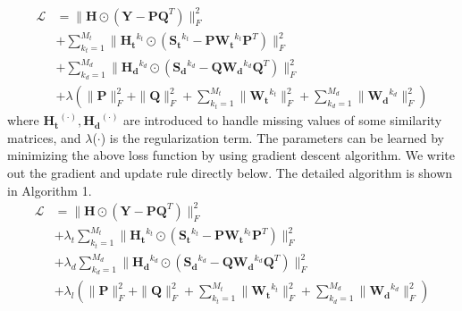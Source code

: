 \documentclass{article}
\begin{document}
\begin{equation} %
\begin{split}
\mathcal{L} &= \|\bm{H}\odot(\bm{Y}-\bm{P}\bm{Q}^T)\|_F^2 \\
&+ \sum_{k_t=1}^{M_t}\|\bm{H_t}^{k_t}\odot(\bm{S_t}^{k_t}-\bm{P}\bm{W_t}^{k_t}\bm{P}^T)\|_F^2 \\
&+ \sum_{k_d=1}^{M_d}\|\bm{H_d}^{k_d}\odot(\bm{S_d}^{k_d}-\bm{Q}\bm{W_d}^{k_d}\bm{Q}^T)\|_F^2 \\
&+ \lambda(\|\bm{P}\|_F^2+\|\bm{Q}\|_F^2+\sum_{k_t=1}^{M_t}\|\bm{W_t}^{k_t}\|_F^2+\sum_{k_d=1}^{M_d}\|\bm{W_d}^{k_d}\|_F^2)
\end{split}
\end{equation}
where $\bm{H_t}^{(\cdot)}, \bm{H_d}^{(\cdot)}$ are introduced to handle missing values of some similarity matrices, and $\lambda$($\cdot$) is the regularization term. The parameters can be learned by minimizing the above loss function by using gradient descent algorithm. We write out the gradient and update rule directly below. The detailed algorithm is shown in Algorithm 1.\\
\begin{equation} %
\begin{split}
\mathcal{L} &= \|\bm{H}\odot(\bm{Y}-\bm{P}\bm{Q}^T)\|_F^2 \\
&+ \lambda_t\sum_{k_t=1}^{M_t}\|\bm{H_t}^{k_t}\odot(\bm{S_t}^{k_t}-\bm{P}\bm{W_t}^{k_t}\bm{P}^T)\|_F^2 \\
&+ \lambda_d\sum_{k_d=1}^{M_d}\|\bm{H_d}^{k_d}\odot(\bm{S_d}^{k_d}-\bm{Q}\bm{W_d}^{k_d}\bm{Q}^T)\|_F^2 \\
&+ \lambda_l(\|\bm{P}\|_F^2+\|\bm{Q}\|_F^2+\sum_{k_t=1}^{M_t}\|\bm{W_t}^{k_t}\|_F^2+\sum_{k_d=1}^{M_d}\|\bm{W_d}^{k_d}\|_F^2)
\end{split}
\end{equation}
\end{document}
